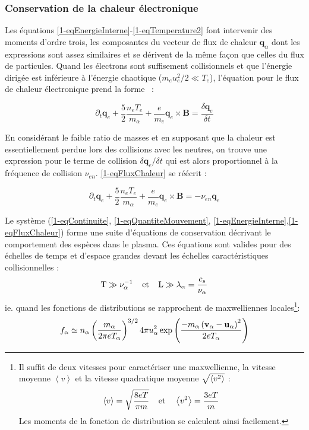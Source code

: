 \begin{refsection}
\subsubsection{Conservation de la chaleur électronique}

Les équations \eqref{1-eqEnergieInterne}-\eqref{1-eqTemperature2} font
intervenir des moments d'ordre trois, les composantes du vecteur de flux de
chaleur $\mathbf q_\alpha$ dont les expressions sont assez similaires et se
dérivent de la même façon que celles du flux de particules. Quand les électrons
sont suffisement collisionnels et que l'énergie dirigée est inférieure à
l'énergie chaotique ($m_eu_e^2/2\ll T_e$), l'équation pour le flux de chaleur
électronique prend la forme~\parencite{Golant} :

\begin{equation}
\label{1-eqFluxChaleur}
\partial_t\mathbf
q_e+\frac{5}{2}\frac{n_e
T_e}{m_\alpha}+\frac{e}{m_e} \mathbf q_e\times\mathbf
B=\frac{\delta\mathbf q_e}{\delta t}
\end{equation}


En considérant le faible ratio de
masses et en supposant que la chaleur est essentiellement perdue lors des
collisions avec les neutres, on trouve une expression pour le terme de collision  $\delta\mathbf q_e/\delta
t$ qui est alors
proportionnel à la fréquence de collision $\nu_{en}$. \eqref{1-eqFluxChaleur} se
réécrit :

\begin{equation}
\label{1-eqFluxChaleur2}
\partial_t\mathbf
q_e+\frac{5}{2}\frac{n_e
T_e}{m_\alpha}+\frac{e}{m_e} \mathbf q_e\times\mathbf
B=-\nu_{en}\mathbf q_e
\end{equation}

Le système (\eqref{1-eqContinuite}, \eqref{1-eqQuantiteMouvement},
\eqref{1-eqEnergieInterne},\eqref{1-eqFluxChaleur}) forme une suite d'équations
de conservation décrivant le comportement des espèces dans le plasma.
Ces équations sont valides pour des échelles de temps et d'espace grandes devant
les échelles caractéristiques collisionnelles :
\begin{equation}
\text{T}\gg \nu_{\alpha}^{{-1}}
\;\;\;\;\text{et}\;\;\;\;\text{L}\gg\lambda_\alpha=\frac{c_s}{\nu_\alpha}
\end{equation}
ie. quand les fonctions de distributions se
rapprochent de maxwelliennes locales\footnote{Il suffit de deux vitesses pour caractériser
une maxwellienne, la vitesse moyenne $\left<v\right>$ et la vitesse quadratique moyenne
$\sqrt{\left<v^{{2}}\right>}$ :
$$
	\left<v\right>=\sqrt{\frac{8eT}{\pi m}} \;\;\;\;\text{et}\;\;\;\; 
	\left<v^{{2}}\right>=\frac{3eT}{m}
$$ Les moments de la fonction de distribution se calculent ainsi facilement.}:
\begin{equation}
\label{1-MaxwellDistribution}
	f_\alpha\simeq n_\alpha
	\left(\frac{m_\alpha}{2\pi
	eT_\alpha}\right)^{{3/2}}4\pi
	u_\alpha^{{2}}\exp\left(\frac{-m_\alpha \left(\mathbf
	v_\alpha-\mathbf u_\alpha\right)^{{2}}}{2eT_\alpha}\right)
\end{equation}


\end{refsection}
